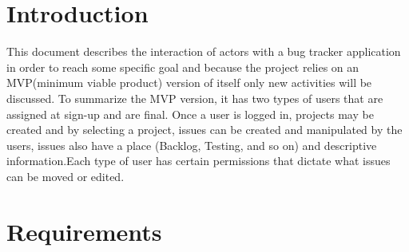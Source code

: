 \documentclass[10pt,a4paper]{article}
\begin{document}
\section{Introduction}
\p This document describes the interaction of actors with a bug tracker application in order to reach some specific goal and because the project relies on an MVP(minimum viable product) version of itself only new activities will be discussed.
\p To summarize the MVP version, it has two types of users that are assigned at sign-up and are final.
\p Once a user is logged in, projects may be created and by selecting a project, issues can be created and manipulated by the users, issues also have a place (Backlog, Testing, and so on) and descriptive information.\p Each type of user has certain permissions that dictate what issues can be moved or edited.

\newpage

\section{Requirements}
\end{document}
